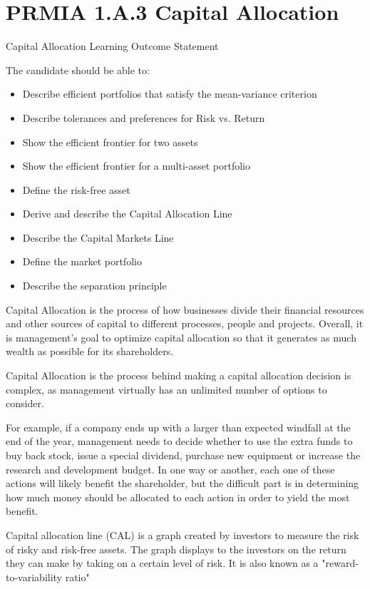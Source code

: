 \section{PRMIA 1.A.3 Capital Allocation }



Capital Allocation Learning Outcome Statement

The candidate should be able to:

\begin{itemize}
\item Describe efficient portfolios that satisfy the mean-variance criterion
\item Describe tolerances and preferences for Risk vs. Return
\item Show the efficient frontier for two assets
\item Show the efficient frontier for a multi-asset portfolio
\item Define the risk-free asset
\item Derive and describe the Capital Allocation Line
\item Describe the Capital Markets Line
\item Define the market portfolio
\item Describe the separation principle
\end{itemize}
Capital Allocation is the process of how businesses divide their financial resources and other sources of capital to different processes, people and projects. Overall, it is management's goal to optimize capital allocation so that it generates as much wealth as possible for its shareholders.


Capital Allocation is the process behind making a capital allocation decision is complex, as management virtually has an unlimited number of options to consider. 


For example, if a company ends up with a larger than expected windfall at the end of the year, management needs to decide whether to use the extra funds to buy back stock, issue a special dividend, purchase new equipment or increase the research and development budget. In one way or another, each one of these actions will likely benefit the shareholder, but the difficult part is in determining how much money should be allocated to each action in order to yield the most benefit.


Capital allocation line (CAL) is a graph created by investors to measure the risk of risky and risk-free assets. The graph displays to the investors on the return they can make by taking on a certain level of risk. It is also known as a "reward-to-variability ratio"


